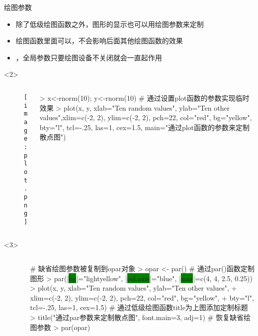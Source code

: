 \begin{frame}[t,fragile]{\subsecname}{绘图参数}
\begin{itemize}
\item<1-> 除了低级绘图函数之外，图形的显示也可以用绘图参数来定制
\item<2-> 绘图函数里面可以，不会影响后面其他绘图函数的效果
\item<3-> ，全局参数只要绘图设备不关闭就会一直起作用
\end{itemize}

\begin{overlayarea}{\textwidth}{\textheight}
\begin{onlyenv}<2>
\begin{columns}
        \begin{column}{.4\textwidth}
          \begin{figure}
            \centering
            \texttt{[image: plot.png]}
          \end{figure}
        \end{column}

        \begin{column}{.6\textwidth}
 \centering
\begin{rcode}
> x<-rnorm(10); y<-rnorm(10)
# 通过设置plot函数的参数实现临时效果
> plot(x, y, xlab="Ten random values", ylab="Ten other values",xlim=c(-2, 2), ylim=c(-2, 2), pch=22, col="red", bg="yellow", bty="l", tcl=-.25, las=1, cex=1.5, main="通过plot函数的参数来定制散点图")
\end{rcode}
        \end{column}
      \end{columns}
\end{onlyenv}

\begin{onlyenv}<3>
\begin{columns}
        \begin{column}{.4\textwidth}
          \begin{figure}
            \centering
            \texttt{[image: par.png]}
          \end{figure}
        \end{column}

        \begin{column}{.6\textwidth}
 \centering
\begin{rcode}
# 缺省绘图参数被复制到opar对象
> opar <- par()
# 通过par()函数定制图形
> par(|\colorbox{green}{bg}|="lightyellow", |\colorbox{green}{col.axis}|="blue", |\colorbox{green}{mar}|=c(4, 4, 2.5, 0.25))
> plot(x, y, xlab="Ten random values", ylab="Ten other values",
+ xlim=c(-2, 2), ylim=c(-2, 2), pch=22, col="red", bg="yellow",
+ bty="l", tcl=-.25, las=1, cex=1.5)
# 通过低级绘图函数title为上图添加定制标题
> title("通过par参数来定制散点图", font.main=3, adj=1)
# 恢复缺省绘图参数
> par(opar)
\end{rcode}
        \end{column}
      \end{columns}
\end{onlyenv}
\end{overlayarea}  
\end{frame}

